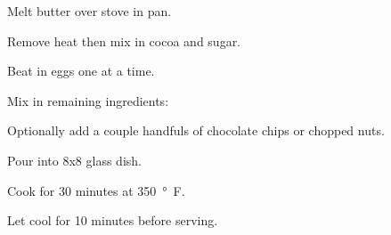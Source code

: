

Melt butter over stove in pan.

\begin{ingredients}
\end{ingredients}

Remove heat then mix in cocoa and sugar.

\begin{ingredients}
\end{ingredients}

Beat in eggs one at a time.

\begin{ingredients}
\end{ingredients}

Mix in remaining ingredients:

\begin{ingredients}
\end{ingredients}

Optionally add a couple handfuls of chocolate chips or chopped nuts.

\begin{ingredients}
\end{ingredients}

Pour into 8x8 glass dish.

Cook for 30 minutes at \SI{350}{°F}.

Let cool for 10 minutes before serving.
